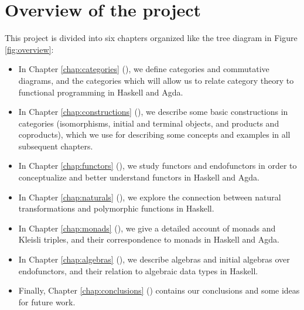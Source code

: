 




\section*{Overview of the project}
\label{sec:introduction-overview}

This project is divided into six chapters organized like the tree
diagram in Figure \ref{fig:overview}:
\begin{itemize}
\item
  In Chapter \ref{chap:categories} (), we
  define categories and commutative diagrams, and the categories which
  will allow us to relate category theory to functional programming in
  Haskell and Agda.

\item
  In Chapter \ref{chap:constructions} (),
  we describe some basic constructions in categories (isomorphisms,
  initial and terminal objects, and products and coproducts), which we
  use for describing some concepts and examples in all subsequent
  chapters.

\item
  In Chapter \ref{chap:functors} (), we study
  functors and endofunctors in order to conceptualize and better
  understand functors in Haskell and Agda.

\item
  In Chapter \ref{chap:naturals} (), we explore
  the connection between natural transformations and polymorphic
  functions in Haskell.

\item
  In Chapter \ref{chap:monads} (), we give a
  detailed account of monads and Kleisli triples, and their
  correspondence to monads in Haskell and Agda.

\item
  In Chapter \ref{chap:algebras} (), we
  describe algebras and initial algebras over endofunctors, and their
  relation to algebraic data types in Haskell.

\item
  Finally, Chapter \ref{chap:conclusions} ()
  contains our conclusions and some ideas for future work.

\end{itemize}

